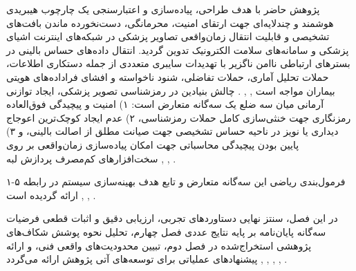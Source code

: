 


پژوهش حاضر با هدف طراحی، پیاده‌سازی و اعتبارسنجی یک چارچوب هیبریدی هوشمند و چندلایه‌ای جهت ارتقای امنیت، محرمانگی، دست‌نخورده ماندن بافت‌های تشخیصی و قابلیت انتقال زمان‌واقعی تصاویر پزشکی در شبکه‌های اینترنت اشیای پزشکی  و سامانه‌های سلامت الکترونیک  تدوین گردید. انتقال داده‌های حساس بالینی در بسترهای ارتباطی ناامن ناگزیر با تهدیدات سایبری متعددی از جمله دستکاری اطلاعات، حملات تحلیل آماری، حملات تفاضلی، شنود ناخواسته و افشای فراداده‌های هویتی بیماران مواجه است , , . چالش بنیادین در رمزشناسی تصویر پزشکی، ایجاد توازنی آرمانی میان سه ضلع یک سه‌گانه متعارض  است: ۱) امنیت و پیچیدگی فوق‌العاده رمزنگاری جهت خنثی‌سازی کامل حملات رمزشناسی، ۲) عدم ایجاد کوچک‌ترین اعوجاج دیداری یا نویز در ناحیه حساس تشخیصی  جهت صیانت مطلق از اصالت بالینی، و ۳) پایین بودن پیچیدگی محاسباتی جهت امکان پیاده‌سازی زمان‌واقعی بر روی سخت‌افزارهای کم‌مصرف پردازش لبه  , , .\par



فرمول‌بندی ریاضی این سه‌گانه متعارض و تابع هدف بهینه‌سازی سیستم در رابطه ۵{-}۱ ارائه گردیده است , , .\par






در این فصل، سنتز نهایی دستاوردهای تجربی، ارزیابی دقیق و اثبات قطعی فرضیات سه‌گانه پایان‌نامه بر پایه نتایج عددی فصل چهارم، تحلیل نحوه پوشش شکاف‌های پژوهشی استخراج‌شده در فصل دوم، تبیین محدودیت‌های واقعی فنی، و ارائه پیشنهادهای عملیاتی برای توسعه‌های آتی پژوهش ارائه می‌گردد , , , , .\par

